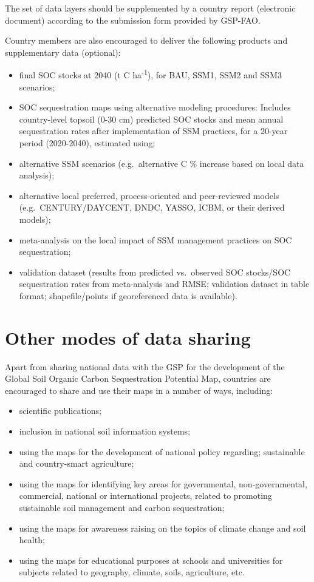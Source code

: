\documentclass[
  10pt,
  b5paper,
]{book}
\providecommand{\tightlist}{%
  \setlength{\itemsep}{0pt}\setlength{\parskip}{0pt}}
\begin{document}
The set of data layers should be supplemented by a country report (electronic document) according to the submission form provided by GSP-FAO.

Country members are also encouraged to deliver the following products and supplementary data (optional):

\begin{itemize}
\tightlist
\item
  final SOC stocks at 2040 (t C ha\textsuperscript{-1}), for BAU, SSM1, SSM2 and SSM3 scenarios;
\item
  SOC sequestration maps using alternative modeling procedures: Includes country-level topsoil (0-30 cm) predicted SOC stocks and mean annual sequestration rates after implementation of SSM practices, for a 20-year period (2020-2040), estimated using;
\item
  alternative SSM scenarios (e.g.~alternative C \% increase based on local data analysis);
\item
  alternative local preferred, process-oriented and peer-reviewed models (e.g.~CENTURY/DAYCENT, DNDC, YASSO, ICBM, or their derived models);
\item
  meta-analysis on the local impact of SSM management practices on SOC sequestration;
\item
  validation dataset (results from predicted vs.~observed SOC stocks/SOC sequestration rates from meta-analysis and RMSE; validation dataset in table format; shapefile/points if georeferenced data is available).
\end{itemize}

\hypertarget{other-modes-of-data-sharing}{%
\section{Other modes of data sharing}\label{other-modes-of-data-sharing}}

Apart from sharing national data with the GSP for the development of the Global Soil Organic Carbon Sequestration Potential Map, countries are encouraged to share and use their maps in a number of ways, including:

\begin{itemize}
\tightlist
\item
  scientific publications;
\item
  inclusion in national soil information systems;
\item
  using the maps for the development of national policy regarding; sustainable and country-smart agriculture;
\item
  using the maps for identifying key areas for governmental, non-governmental, commercial, national or international projects, related to promoting sustainable soil management and carbon sequestration;
\item
  using the maps for awareness raising on the topics of climate change and soil health;
\item
  using the maps for educational purposes at schools and universities for subjects related to geography, climate, soils, agriculture, etc.
\end{itemize}
\end{document}
